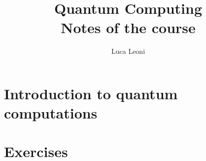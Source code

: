 \documentclass[12pt]{report}
\title{\Huge{Quantum Computing}\\Notes of the course}
\author{\huge{Luca Leoni}}
\date{}
\begin{document}
    \maketitle

    \tableofcontents

    \chapter{Introduction to quantum computations}
    
    
    
    
    
    

    \chapter{Exercises}
    
    
\end{document}
